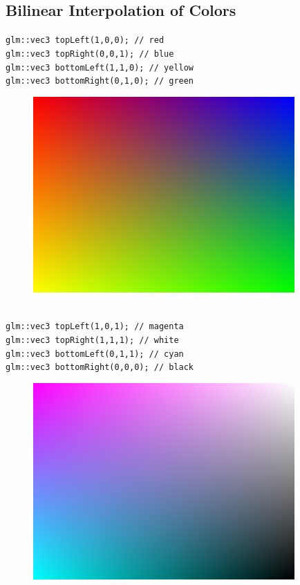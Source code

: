 \subsection{Bilinear Interpolation of Colors}
\texttt{glm::vec3 topLeft(1,0,0); // red \\
glm::vec3 topRight(0,0,1); // blue\\
glm::vec3 bottomLeft(1,1,0); // yellow\\
glm::vec3 bottomRight(0,1,0); // green }
\begin{figure}[ht]
        \includegraphics[width=10cm]{screenshots/bil_inter_1.png}
\end{figure}
\\
\texttt{glm::vec3 topLeft(1,0,1); // magenta\\
	glm::vec3 topRight(1,1,1); // white\\
	glm::vec3 bottomLeft(0,1,1); // cyan\\
	glm::vec3 bottomRight(0,0,0); // black}
\begin{figure}[ht]
        \includegraphics[width=10cm]{screenshots/bil_inter_2.png}
\end{figure}

